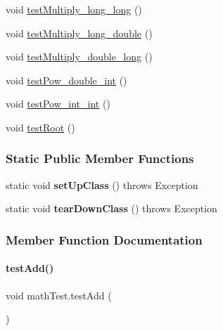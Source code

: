 \begin{DoxyCompactItemize}
\item 
void \hyperlink{classmathTest_a9a2648892e6754d74c2a700705c7e527}{test\+Multiply\+\_\+long\+\_\+long} ()
\item 
void \hyperlink{classmathTest_a842730cc093ddf9b90d555e3ef719e54}{test\+Multiply\+\_\+long\+\_\+double} ()
\item 
void \hyperlink{classmathTest_a38f4681f12025a022601deccac67a806}{test\+Multiply\+\_\+double\+\_\+long} ()
\item 
void \hyperlink{classmathTest_aee6435f28eae194e7d9a8570f62575ca}{test\+Pow\+\_\+double\+\_\+int} ()
\item 
void \hyperlink{classmathTest_a48eac360a196ee3d36424e5628225145}{test\+Pow\+\_\+int\+\_\+int} ()
\item 
void \hyperlink{classmathTest_afb4b3d0809188a73c874f8a19a08490a}{test\+Root} ()
\end{DoxyCompactItemize}
\subsubsection*{Static Public Member Functions}
\begin{DoxyCompactItemize}
\item 
\mbox{\label{classmathTest_ab7c291c586e00e373fc2a5a939fc32a8}} 
static void {\bfseries set\+Up\+Class} ()  throws Exception 
\item 
\mbox{\label{classmathTest_a99955b9871af1e4c9a2245c4097fa418}} 
static void {\bfseries tear\+Down\+Class} ()  throws Exception 
\end{DoxyCompactItemize}


\subsubsection{Member Function Documentation}
\mbox{\label{classmathTest_a668450783db3595473dc34b7c31b6594}} 
\paragraph{\texorpdfstring{test\+Add()}{testAdd()}}
{\footnotesize\ttfamily void math\+Test.\+test\+Add (\begin{DoxyParamCaption}{ }\end{DoxyParamCaption})\hspace{0.3cm}{\ttfamily [inline]}}


